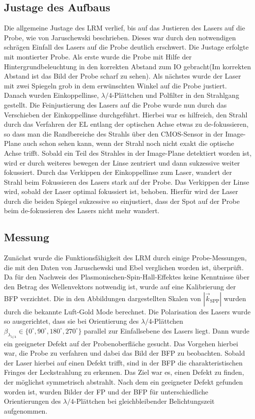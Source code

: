 \documentclass{article}
\begin{document}
\subsection{Justage des Aufbaus}
Die allgemeine Justage des LRM verlief, bis auf das Justieren des Lasers auf die Probe, wie von Jaruschewski \cite{Jaruschewski.2020} beschrieben. Dieses war durch den notwendigen schrägen Einfall des Lasers auf die Probe deutlich erschwert. Die Justage erfolgte mit montierter Probe. Als erste wurde die Probe mit Hilfe der Hintergrundbeleuchtung in den korrekten Abstand zum IO gebracht(Im korrekten Abstand ist das Bild der Probe scharf zu sehen). Als nächstes wurde der Laser mit zwei Spiegeln grob in dem erwünschten Winkel auf die Probe justiert. Danach wurden Einkoppellinse, $\lambda/4$-Plättchen und Polfilter in den Strahlgang gestellt. Die Feinjustierung des Lasers auf die Probe wurde nun durch das Verschieben der Einkoppellinse durchgeführt. Hierbei war es hilfreich, den Strahl durch das Verfahren der EL entlang der optischen Achse etwas zu de-fokussieren, so dass man die Randbereiche des Strahls über den CMOS-Sensor in der Image-Plane auch schon sehen kann, wenn der Strahl noch nicht exakt die optische Achse trifft. Sobald ein Teil des Strahles in der Image-Plane detektiert worden ist, wird er durch weiteres bewegen der Linse zentriert und dann sukzessive weiter fokussiert. Durch das Verkippen der Einkoppellinse zum Laser, wandert der Strahl beim Fokussieren des Lasers stark auf der Probe. Das Verkippen der Linse wird, sobald der Laser optimal fokussiert ist, behoben. Hierfür wird der Laser durch die beiden Spiegel sukzessive so einjustiert, dass der Spot auf der Probe beim de-fokussieren des Lasers nicht mehr wandert. 
\subsection{Messung}
Zunächst wurde die Funktionsfähigkeit des LRM durch einige Probe-Messungen, die mit den Daten von Jaruschewski \cite{Jaruschewski.2020} und Ebel \cite{ebel.2019} verglichen worden ist, überprüft. Da für den Nachweis des Plasmonischen-Spin-Hall-Effektes keine Kenntnisse über den Betrag des Wellenvektors notwendig ist, wurde auf eine Kalibrierung der BFP verzichtet. Die in den Abbildungen dargestellten Skalen von $|\vec{k}_{\mathrm{SPP}}|$ wurden durch die bekannte Luft-Gold Mode berechnet. Die Polarisation des Lasers wurde so ausgerichtet, dass sie bei Orientierung des $\lambda/4$-Plättchen $\beta_{\lambda_{\lambda/4}} \in \{0^\circ, 90^\circ, 180^\circ, 270^\circ\}$ parallel zur Einfallsebene des Lasers liegt.  Dann wurde ein geeigneter Defekt auf der Probenoberfläche gesucht. Das Vorgehen hierbei war, die Probe zu verfahren und dabei das Bild der BFP zu beobachten. Sobald der Laser hierbei auf einen Defekt trifft, sind in der BFP die charakteristischen Fringes der Leckstrahlung zu erkennen. Das Ziel war es, einen Defekt zu finden, der möglichst symmetrisch abstrahlt. Nach dem ein geeigneter Defekt gefunden worden ist, wurden Bilder der FP und der BFP für unterschiedliche Orientierungen des $\lambda/4$-Plättchen bei gleichbleibender Belichtungszeit aufgenommen.
\end{document}

